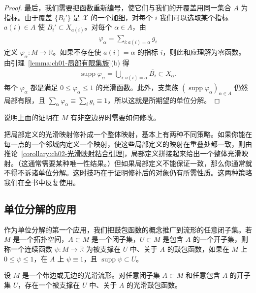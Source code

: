 \documentclass[../../main.tex]{subfiles}
\begin{document}
\begin{proof}
最后，我们需要把函数重新编号，使它们与我们的开覆盖用同一集合 $A$ 为指标。由于覆盖 $\{B_{i}'\}$ 是 $\mathcal{X}$ 的一个加细，对每个 $i$ 我们可以选取某个指标 $a(i)\in A$ 使 $B_{i}'\subset X_{a(i)}$。对每个 $\alpha\in A$，由
\begin{align*}
\varphi_{\alpha}=\sum_{i:a(i)=\alpha}g_{i}
\end{align*}
定义 $\varphi_{\alpha}:M\to\mathbb{R}$。如果不存在使 $a(i)=\alpha$ 的指标 $i$，则此和应理解为零函数。由引理~\cref{lemma:ch01-局部有限集族}(b) 得
\begin{align*}
\operatorname{supp}\varphi_{\alpha}=\bigcup_{i:a(i)=\alpha}\overline{B_{i}}\subset X_{\alpha}.
\end{align*}
每个 $\varphi_{\alpha}$ 都是满足 $0\leqslant\varphi_{\alpha}\leqslant 1$ 的光滑函数。此外，支集族 $(\operatorname{supp}\varphi_{\alpha})_{\alpha\in A}$ 仍然局部有限，且 $\sum_{\alpha}\varphi_{\alpha}\equiv\sum_{i}g_{i}\equiv 1$，所以这就是所期望的单位分解。
\end{proof}

\begin{exercise}\label{exercise:ch02-2.24}
说明上面的证明在 $M$ 有非空边界时需要如何修改。
\end{exercise}

把局部定义的光滑映射修补成一个整体映射，基本上有两种不同策略。如果你能在每一点的一个邻域内定义一个映射，使这些局部定义的映射在重叠处都一致，则由推论~\cref{corollary:ch02-光滑映射粘合引理}，局部定义拼接起来给出一个整体光滑映射。（这通常需要某种唯一性结果。）但如果局部定义不能保证一致，那么你通常就不得不诉诸单位分解。这时技巧在于证明修补后的对象仍有所需性质。这两种策略我们在全书中反复使用。
\subsection{单位分解的应用}\label{subsection:ch02-单位分解的应用}

作为单位分解的第一个应用，我们把鼓包函数的概念推广到流形的任意闭子集。若 $M$ 是一个拓扑空间，$A\subset M$ 是一个闭子集，$U\subset M$ 是包含 $A$ 的一个开子集，则称一个连续函数 $\psi:M\to\mathbb{R}$ 为被支撑在 $U$ 中、关于 $A$ 的鼓包函数，如果在 $M$ 上 $0\leqslant\psi\leqslant 1$，在 $A$ 上 $\psi\equiv 1$，且 $\operatorname{supp}\psi\subset U$。

\begin{proposition}[光滑鼓包函数的存在性]\label{proposition:ch02-光滑鼓包存在}
设 $M$ 是一个带边或无边的光滑流形。对任意闭子集 $A\subset M$ 和任意包含 $A$ 的开子集 $U$，存在一个被支撑在 $U$ 中、关于 $A$ 的光滑鼓包函数。
\end{proposition}
\end{document}
